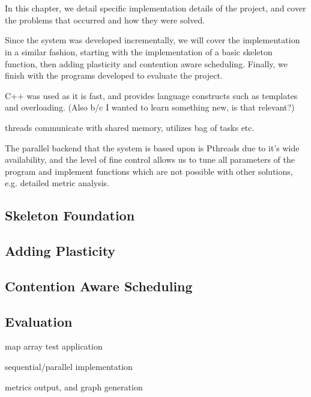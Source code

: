\section{}

In this chapter, we detail specific implementation details of the project, and cover the problems that occurred and how they were solved.

Since the system was developed incrementally, we will cover the implementation in a similar fashion, starting with the implementation of a basic skeleton function, then adding plasticity and contention aware scheduling. Finally, we finish with the programs developed to evaluate the project.





C++ was used as it is fast, and provides language constructs such as templates and overloading. (Also b/c I wanted to learn something new, is that relevant?)

threads communicate with shared memory, utilizes bag of tasks etc.

The parallel backend that the system is based upon is Pthreads due to it's wide availability, and the level of fine control allows us to tune all parameters of the program and implement functions which are not possible with other solutions, e.g. detailed metric analysis. 

\subsection{Skeleton Foundation}



\subsection{Adding Plasticity}



\subsection{Contention Aware Scheduling}



\subsection{Evaluation}

map array test application

sequential/parallel implementation

metrics output, and graph generation